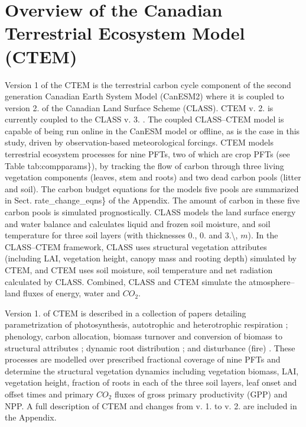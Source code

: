 \hypertarget{index_overviewCTEM}{}\section{Overview of the Canadian Terrestrial Ecosystem Model (\+C\+T\+E\+M)}\label{index_overviewCTEM}
Version 1 of the C\+T\+E\+M is the terrestrial carbon cycle component of the second generation Canadian Earth System Model (Can\+E\+S\+M2) \cite{Arora2011-79f} where it is coupled to version 2. of the Canadian Land Surface Scheme (C\+L\+A\+S\+S). C\+T\+E\+M v. 2. \cite{Melton2016-zx} is currently coupled to the C\+L\+A\+S\+S v. 3. \cite{Verseghy2012-c0e}. The coupled C\+L\+A\+S\+S--C\+T\+E\+M model is capable of being run online in the Can\+E\+S\+M model or offline, as is the case in this study, driven by observation-\/based meteorological forcings. C\+T\+E\+M models terrestrial ecosystem processes for nine P\+F\+Ts, two of which are crop P\+F\+Ts (see Table tab\+:compparams\}), by tracking the flow of carbon through three living vegetation components (leaves, stem and roots) and two dead carbon pools (litter and soil). The carbon budget equations for the model\textquotesingle{}s five pools are summarized in Sect. rate\+\_\+change\+\_\+eqns\} of the Appendix. The amount of carbon in these five carbon pools is simulated prognostically. C\+L\+A\+S\+S models the land surface energy and water balance and calculates liquid and frozen soil moisture, and soil temperature for three soil layers (with thicknesses 0., 0. and 3.\textbackslash{}, $m$). In the C\+L\+A\+S\+S--C\+T\+E\+M framework, C\+L\+A\+S\+S uses structural vegetation attributes (including L\+A\+I, vegetation height, canopy mass and rooting depth) simulated by C\+T\+E\+M, and C\+T\+E\+M uses soil moisture, soil temperature and net radiation calculated by C\+L\+A\+S\+S. Combined, C\+L\+A\+S\+S and C\+T\+E\+M simulate the atmosphere--land fluxes of energy, water and $CO_2$.

Version 1. of C\+T\+E\+M is described in a collection of papers detailing parametrization of photosynthesis, autotrophic and heterotrophic respiration \cite{Arora2003-3b7}; phenology, carbon allocation, biomass turnover and conversion of biomass to structural attributes \cite{Arora2005-6b1}; dynamic root distribution \cite{Arora2003838}; and disturbance (fire) \cite{Arora20052ac}. These processes are modelled over prescribed fractional coverage of nine P\+F\+Ts \cite{Wang2006-he} and determine the structural vegetation dynamics including vegetation biomass, L\+A\+I, vegetation height, fraction of roots in each of the three soil layers, leaf onset and offset times and primary $CO_2$ fluxes of gross primary productivity (G\+P\+P) and N\+P\+P. A full description of C\+T\+E\+M and changes from v. 1. to v. 2. are included in the Appendix.

